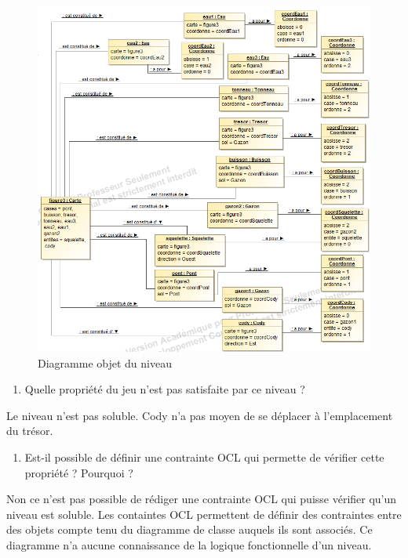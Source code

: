 \documentclass[]{article}
\providecommand{\tightlist}{%
  \setlength{\itemsep}{0pt}\setlength{\parskip}{0pt}}
\begin{document}
\begin{figure}
\centering
\includegraphics{./images_final/PlateauQ4.png}
\caption{Diagramme objet du niveau}
\end{figure}

\begin{enumerate}
\def\labelenumi{\arabic{enumi})}
\setcounter{enumi}{1}
\tightlist
\item
  Quelle propriété du jeu n'est pas satisfaite par ce niveau ?
\end{enumerate}

Le niveau n'est pas soluble. Cody n'a pas moyen de se déplacer à
l'emplacement du trésor.

\begin{enumerate}
\def\labelenumi{\arabic{enumi})}
\setcounter{enumi}{2}
\tightlist
\item
  Est-il possible de définir une contrainte OCL qui permette de vérifier cette propriété ? Pourquoi ?
\end{enumerate}

Non ce n'est pas possible de rédiger une contrainte OCL qui puisse
vérifier qu'un niveau est soluble. Les containtes OCL permettent de
définir des contraintes entre des objets compte tenu du diagramme de
classe auquels ils sont associés. Ce diagramme n'a aucune connaissance
de la logique fonctionnelle d'un niveau.
\end{document}
